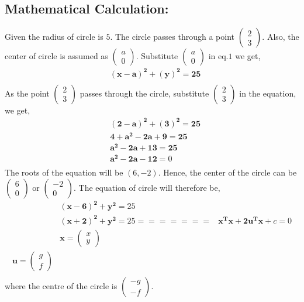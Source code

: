 \documentclass[a4paper,12pt,twocolumn]{article}
\let\vec\mathbf
\newcommand{\myvec}[1]{\ensuremath{\begin{pmatrix}#1\end{pmatrix}}}
\begin{document}
\subsection{Mathematical Calculation:}
Given the radius of circle is $5$. The circle passes through a point $\myvec{2\\3}$. Also, the center of circle is assumed as $\myvec{a\\0}$. Substitute $\myvec{a\\0}$ in eq.$1$ we get,
\begin{align}
	&\vec{(x-a)^2} + \vec{(y)^2} = \vec{25}\\
\end{align}
As the point $\myvec{2\\3}$ passes through the circle, substitute $\myvec{2\\3}$ in the equation, we get,
\begin{align}
	&\vec{(2-a)^2} + \vec{(3)^2} = \vec{25}\\
	&\vec{4+a^2-2a} + \vec{9} = \vec{25}\\
	&\vec{a^2-2a+13} = \vec{25}\\
	&\vec{a^2-2a-12} = 0\\
\end{align}
The roots of the equation will be $(6,-2)$. Hence, the center of the circle can be $\myvec{6\\0}$ or $\myvec{-2\\0}$.
The equation of circle will therefore be,
\begin{align}
	&\vec{(x-6)^2} + \vec{y^2} = 25\\
	&\vec{(x+2)^2} + \vec{y^2} = 25
=======
	&\vec{x^Tx} + \vec{2u^Tx} + c = 0\\
	&\vec{x} = \myvec{x\\y}\\\vec{u} = \myvec{g\\f}\\
\end{align}
where the centre of the circle is $\myvec{-g\\-f}$.
\end{document}
